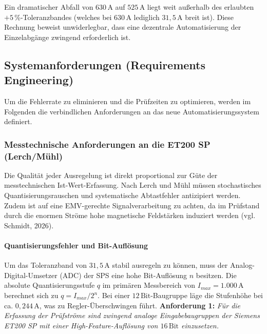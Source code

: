 Ein dramatischer Abfall von $630\,\text{A}$ auf $525\,\text{A}$ liegt weit außerhalb des erlaubten $+5\,\%$-Toleranz\-bandes (welches bei $630\,\text{A}$ lediglich $31,5\,\text{A}$ breit ist). Diese Rechnung beweist unwiderlegbar, dass eine dezentrale Automatisierung der Einzelabgänge zwingend erforderlich ist.


\subsection{Systemanforderungen (Requirements Engineering)}
\label{sec:systemanforderungen}

Um die Fehlerrate zu eliminieren und die Prüfzeiten zu optimieren, werden im Folgenden die verbindlichen Anforderungen an das neue Automatisierungssystem definiert.
\subsubsection{Messtechnische Anforderungen an die ET200 SP (Lerch/Mühl)}
Die Qualität jeder Ausregelung ist direkt proportional zur Güte der messtechnischen Ist-Wert-Erfassung. Nach Lerch und Mühl \cite{Lerch_Messtechnik, Muehl_Messtechnik} müssen stochastisches Quantisierungsrauschen und systematische Abtastfehler antizipiert werden. Zudem ist auf eine EMV-gerechte Signalverarbeitung zu achten, da im Prüfstand durch die enormen Ströme hohe magnetische Feldstärken induziert werden (vgl. Schmidt, 2026).
\paragraph{Quantisierungsfehler und Bit-Auflösung}
Um das Toleranzband von $31,5\,\text{A}$ stabil ausregeln zu können, muss der Analog-Digital-Umsetzer (ADC) der SPS eine hohe Bit-Auflösung $n$ besitzen. Die absolute Quantisierungsstufe $q$ im primären Messbereich von $I_{max} = 1.000\,\text{A}$ berechnet sich zu $q = I_{max} / 2^n$. Bei einer $12\,\text{Bit}$-Baugruppe läge die Stufenhöhe bei ca. $0,244\,\text{A}$, was zu Regler-Überschwingen führt.
\textbf{Anforderung 1:} \textit{Für die Erfassung der Prüfströme sind zwingend analoge Eingabebaugruppen der Siemens ET200 SP mit einer High-Feature-Auflösung von $16\,\text{Bit}$ einzusetzen.}
